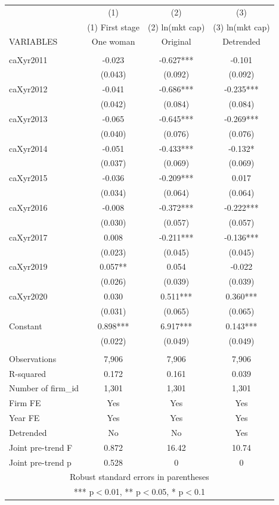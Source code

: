 \begin{tabular}{lccc} \hline
 & (1) & (2) & (3) \\
 & (1) First stage & (2) ln(mkt cap) & (3) ln(mkt cap) \\
VARIABLES & One woman & Original & Detrended \\ \hline
 &  &  &  \\
caXyr2011 & -0.023 & -0.627*** & -0.101 \\
 & (0.043) & (0.092) & (0.092) \\
caXyr2012 & -0.041 & -0.686*** & -0.235*** \\
 & (0.042) & (0.084) & (0.084) \\
caXyr2013 & -0.065 & -0.645*** & -0.269*** \\
 & (0.040) & (0.076) & (0.076) \\
caXyr2014 & -0.051 & -0.433*** & -0.132* \\
 & (0.037) & (0.069) & (0.069) \\
caXyr2015 & -0.036 & -0.209*** & 0.017 \\
 & (0.034) & (0.064) & (0.064) \\
caXyr2016 & -0.008 & -0.372*** & -0.222*** \\
 & (0.030) & (0.057) & (0.057) \\
caXyr2017 & 0.008 & -0.211*** & -0.136*** \\
 & (0.023) & (0.045) & (0.045) \\
caXyr2019 & 0.057** & 0.054 & -0.022 \\
 & (0.026) & (0.039) & (0.039) \\
caXyr2020 & 0.030 & 0.511*** & 0.360*** \\
 & (0.031) & (0.065) & (0.065) \\
Constant & 0.898*** & 6.917*** & 0.143*** \\
 & (0.022) & (0.049) & (0.049) \\
 &  &  &  \\
Observations & 7,906 & 7,906 & 7,906 \\
R-squared & 0.172 & 0.161 & 0.039 \\
Number of firm\_id & 1,301 & 1,301 & 1,301 \\
Firm FE & Yes & Yes & Yes \\
Year FE & Yes & Yes & Yes \\
Detrended & No & No & Yes \\
Joint pre-trend F & 0.872 & 16.42 & 10.74 \\
 Joint pre-trend p & 0.528 & 0 & 0 \\ \hline
\multicolumn{4}{c}{ Robust standard errors in parentheses} \\
\multicolumn{4}{c}{ *** p$<$0.01, ** p$<$0.05, * p$<$0.1} \\
\end{tabular}
